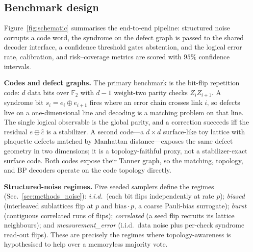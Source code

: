\documentclass[reprint,aps,prxquantum,amsmath,amssymb,floatfix,nofootinbib,longbibliography]{revtex4-2}
\theoremstyle{definition}
\theoremstyle{remark}
\theoremstyle{plain}
\newcommand{\F}{\mathbb{F}}
\begin{document}
\subsection{Benchmark design}
\label{sec:design}

Figure~\ref{fig:schematic} summarises the end-to-end pipeline: structured noise corrupts a code word, the syndrome on the defect graph is passed to the shared decoder interface, a confidence threshold gates abstention, and the logical error rate, calibration, and risk--coverage metrics are scored with $95\%$ confidence intervals.

\textbf{Codes and defect graphs.} The primary benchmark is the bit-flip repetition code: $d$ data bits over $\F_2$ with $d-1$ weight-two parity checks $Z_iZ_{i+1}$. A syndrome bit $s_i=e_i\oplus e_{i+1}$ fires where an error chain crosses link $i$, so defects live on a one-dimensional line and decoding is a matching problem on that line. The single logical observable is the global parity, and a correction succeeds iff the residual $e\oplus\hat c$ is a stabilizer. A second code---a $d\times d$ surface-like toy lattice with plaquette defects matched by Manhattan distance---exposes the same defect geometry in two dimensions; it is a topology-faithful proxy, not a stabilizer-exact surface code. Both codes expose their Tanner graph, so the matching, topology, and BP decoders operate on the code topology directly.

\textbf{Structured-noise regimes.} Five seeded samplers define the regimes (Sec.~\ref{sec:methods_noise}): \emph{i.i.d.}\ (each bit flips independently at rate $p$); \emph{biased} (interleaved sublattices flip at $p$ and $\mathrm{bias}\cdot p$, a coarse Pauli-bias surrogate); \emph{burst} (contiguous correlated runs of flips); \emph{correlated} (a seed flip recruits its lattice neighbours); and \emph{measurement\_error} (i.i.d.\ data noise plus per-check syndrome read-out flips). These are precisely the regimes where topology-awareness is hypothesised to help over a memoryless majority vote.
\end{document}

